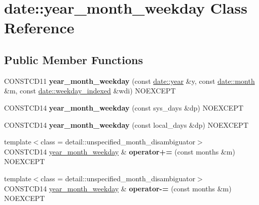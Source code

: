 \hypertarget{classdate_1_1year__month__weekday}{}\section{date\+::year\+\_\+month\+\_\+weekday Class Reference}
\label{classdate_1_1year__month__weekday}
\subsection*{Public Member Functions}
\begin{DoxyCompactItemize}
\item 
\mbox{\label{classdate_1_1year__month__weekday_a2a22f7241822349ee24e4dc238ddf36a}} 
C\+O\+N\+S\+T\+C\+D11 {\bfseries year\+\_\+month\+\_\+weekday} (const \mbox{\hyperlink{classdate_1_1year}{date\+::year}} \&y, const \mbox{\hyperlink{classdate_1_1month}{date\+::month}} \&m, const \mbox{\hyperlink{classdate_1_1weekday__indexed}{date\+::weekday\+\_\+indexed}} \&wdi) N\+O\+E\+X\+C\+E\+PT
\item 
\mbox{\label{classdate_1_1year__month__weekday_ac0325880052a0d2db1f820629d1dcad8}} 
C\+O\+N\+S\+T\+C\+D14 {\bfseries year\+\_\+month\+\_\+weekday} (const sys\+\_\+days \&dp) N\+O\+E\+X\+C\+E\+PT
\item 
\mbox{\label{classdate_1_1year__month__weekday_a1d541d88cde0d0bdd6c419dad416299c}} 
C\+O\+N\+S\+T\+C\+D14 {\bfseries year\+\_\+month\+\_\+weekday} (const local\+\_\+days \&dp) N\+O\+E\+X\+C\+E\+PT
\item 
\mbox{\label{classdate_1_1year__month__weekday_ae172b339579bacc4e331eb813c22e51d}} 
{\footnotesize template$<$class  = detail\+::unspecified\+\_\+month\+\_\+disambiguator$>$ }\\C\+O\+N\+S\+T\+C\+D14 \mbox{\hyperlink{classdate_1_1year__month__weekday}{year\+\_\+month\+\_\+weekday}} \& {\bfseries operator+=} (const months \&m) N\+O\+E\+X\+C\+E\+PT
\item 
\mbox{\label{classdate_1_1year__month__weekday_a00b0f5d680fe9dd86272889ea9abff84}} 
{\footnotesize template$<$class  = detail\+::unspecified\+\_\+month\+\_\+disambiguator$>$ }\\C\+O\+N\+S\+T\+C\+D14 \mbox{\hyperlink{classdate_1_1year__month__weekday}{year\+\_\+month\+\_\+weekday}} \& {\bfseries operator-\/=} (const months \&m) N\+O\+E\+X\+C\+E\+PT

\end{DoxyCompactItemize}
